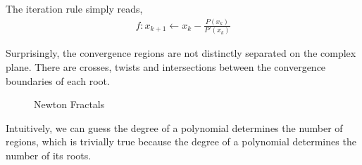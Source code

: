 \documentclass[11pt]{article}
\begin{document}
The iteration rule simply reads,
\begin{align*}
	f: x_{k+1}\leftarrow x_k-\frac{P(x_k)}{P'(x_k)}
\end{align*}

Surprisingly, the convergence regions are not distinctly separated on the complex plane. There are crosses, twists and intersections between the convergence boundaries of each root.

\begin{figure}[H]
	\centering
	\centering
	\caption{Newton Fractals}
\end{figure}

Intuitively, we can guess the degree of a polynomial determines the number of regions, which is trivially true because the degree of a polynomial determines the number of its roots.
\end{document}
